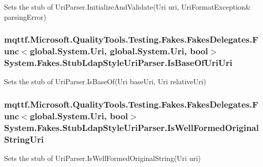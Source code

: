 Sets the stub of Uri\-Parser.\-Initialize\-And\-Validate(Uri uri, Uri\-Format\-Exception\& parsing\-Error)

\hypertarget{class_system_1_1_fakes_1_1_stub_ldap_style_uri_parser_ac418eaed227a61ea350d9b741c07a912}{
\subsubsection[{Is\-Base\-Of\-Uri\-Uri}]{\setlength{\rightskip}{0pt plus 5cm}mqttf.\-Microsoft.\-Quality\-Tools.\-Testing.\-Fakes.\-Fakes\-Delegates.\-Func$<$global.\-System.\-Uri, global.\-System.\-Uri, bool$>$ System.\-Fakes.\-Stub\-Ldap\-Style\-Uri\-Parser.\-Is\-Base\-Of\-Uri\-Uri}}\label{class_system_1_1_fakes_1_1_stub_ldap_style_uri_parser_ac418eaed227a61ea350d9b741c07a912}


Sets the stub of Uri\-Parser.\-Is\-Base\-Of(\-Uri base\-Uri, Uri relative\-Uri)

\hypertarget{class_system_1_1_fakes_1_1_stub_ldap_style_uri_parser_a388d60bf46bd262b3e810e80bcfc9a9b}{
\subsubsection[{Is\-Well\-Formed\-Original\-String\-Uri}]{\setlength{\rightskip}{0pt plus 5cm}mqttf.\-Microsoft.\-Quality\-Tools.\-Testing.\-Fakes.\-Fakes\-Delegates.\-Func$<$global.\-System.\-Uri, bool$>$ System.\-Fakes.\-Stub\-Ldap\-Style\-Uri\-Parser.\-Is\-Well\-Formed\-Original\-String\-Uri}}\label{class_system_1_1_fakes_1_1_stub_ldap_style_uri_parser_a388d60bf46bd262b3e810e80bcfc9a9b}


Sets the stub of Uri\-Parser.\-Is\-Well\-Formed\-Original\-String(\-Uri uri)

